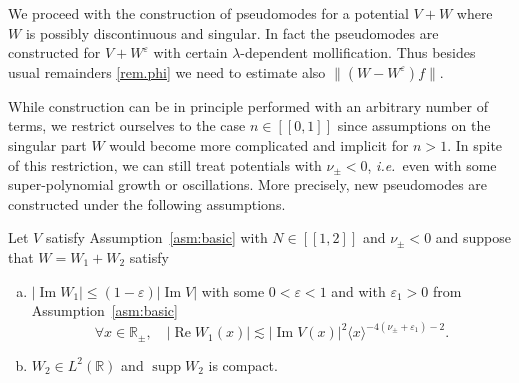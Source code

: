 We proceed with the construction of pseudomodes for a potential $V+W$ where~$W$ is possibly discontinuous and singular. In fact the pseudomodes are constructed for $V+W^{\varepsilon}$ with certain $\lambda$-dependent mollification. Thus besides usual remainders \eqref{rem.phi} we need to estimate also $\|(W-W^{\varepsilon})f\|$. 

While construction can be in principle performed with an arbitrary number of terms, we restrict ourselves to the case $n\in [[0,1]]$ since assumptions on the singular part $W$ would become more complicated and implicit for $n>1$. In spite of this restriction, we can still treat potentials with $\nu_\pm <0$, {\emph{i.e.}}~even with some super-polynomial growth or oscillations. 
More precisely, new pseudomodes are constructed under the following assumptions. 
\begin{Assumption}\label{asm:W}
Let $V$ satisfy Assumption~\ref{asm:basic} with $N \in [[1,2]]$ and $\nu_\pm <0$ and suppose that $W=W_1 + W_2$ satisfy
\begin{enumerate}[a)]
	\item $|{\operatorname{Im}} W_1| \leq (1-{\varepsilon}) |{\operatorname{Im}} V|$ with some $0<{\varepsilon} <1$ and with ${\varepsilon}_1>0$ from Assumption~\ref{asm:basic}	
\begin{equation}\label{asm.eq:ReW_1}
\forall x \in {\mathbb{R}}_\pm, \quad |{\operatorname{Re}} W_1(x)| {\lesssim} |{\operatorname{Im}} V(x)|^2 \langle x \rangle^{-4(\nu_\pm + {\varepsilon}_1)-2}.
\end{equation}
	\item $W_2 \in L^2({\mathbb{R}})$ and ${\mathop{\mathrm{supp}}\nolimits} W_2$ is compact.
\end{enumerate}
\end{Assumption}

